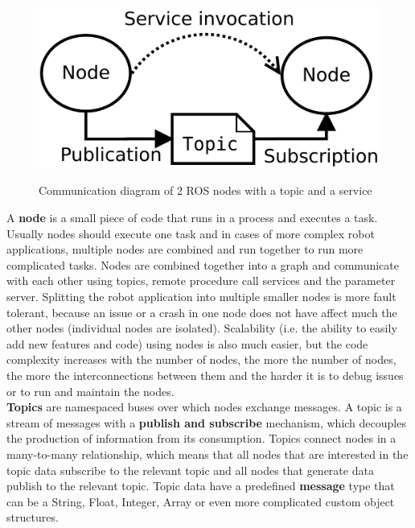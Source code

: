 \begin{center}
\begin{figure}[!htb]
\centering
\includegraphics{images/ROS_basic_concepts_topics_nodes.png}\\
\caption{Communication diagram of 2 ROS nodes with a topic and a service}
\end{figure}
\end{center}

A \textbf{node} is a small piece of code that runs in a process and executes a task. Usually nodes should execute one task and in cases of more complex robot applications, multiple nodes are combined and run together 
to run more complicated tasks. Nodes are combined together into a graph and communicate with each other using topics, remote procedure call services and the parameter server. Splitting the robot application into multiple 
smaller nodes is more fault tolerant, because an issue or a crash in one node does not have affect much the other nodes (individual nodes are isolated). Scalability (i.e. the ability to easily add new features and code) using
nodes is also much easier, but the code complexity increases with the number of nodes, the more the number of nodes, the more the interconnections between them and the harder it is to debug issues or to run and maintain the 
nodes.\\

\textbf{Topics} are namespaced buses over which nodes exchange messages. A topic is a stream of messages with a \textbf{publish and subscribe} mechanism, which decouples the production of information from its consumption. 
Topics connect nodes in a many-to-many relationship, which means that all nodes that are interested in the topic data subscribe to the relevant topic and all nodes that generate data publish to the relevant topic. Topic data 
have a predefined \textbf{message} type that can be a String, Float, Integer, Array or even more complicated custom object structures.



